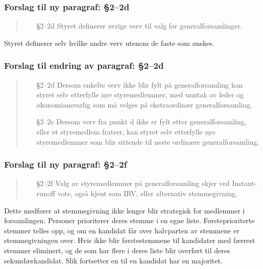 \documentclass[10pt,norsk,a4paper]{article}
\begin{document}
\subsubsection{Forslag til ny paragraf: §2--2d}
\begin{quote}
	\begin{enumerate}
		\item[§2--2d] Styret definerer øvrige verv til valg før generalforsamlinger.
	\end{enumerate}
\end{quote}
Styret definerer selv hvilke andre verv utenom de faste som ønskes.

\subsubsection{Forslag til endring av paragraf: §2--2d}
\begin{quote}
	\begin{enumerate}
		\item[§2--2d] Dersom enkelte verv ikke blir fylt på generalforsamling kan styret selv etterfylle nye styremedlemmer, med unntak av leder og økonomiansvarlig som må velges på ekstraordinær generalforsamling.
		\item[§2--2e] Dersom verv fra punkt d ikke er fylt etter generalforsamling, eller et styremedlem fratrer, kan styret selv etterfylle nye styremedlemmer som blir sittende til neste ordinære generalforsamling.
	\end{enumerate}
\end{quote}

\subsubsection{Forslag til ny paragraf: §2--2f}
\begin{quote}
	\begin{enumerate}
		\item[§2--2f] Valg av styremedlemmer på generalforsamling skjer ved Instant-runoff vote, også kjent som IRV, eller alternativ stemmegivning.
	\end{enumerate}
\end{quote}
Dette medfører at stemmegivning ikke lenger blir strategisk for medlemmer i forsamlingen. Personer prioriterer deres stemme i en egne liste. Førsteprioriterte stemmer telles opp, og om en kandidat får over halvparten av stemmene er stemmegivningen over. Hvis ikke blir førstestemmene til kandidater med færrest stemmer eliminert, og de som har flere i deres liste blir overført til deres sekundærkandidat. Slik fortsetter en til en kandidat har en majoritet.
\end{document}
